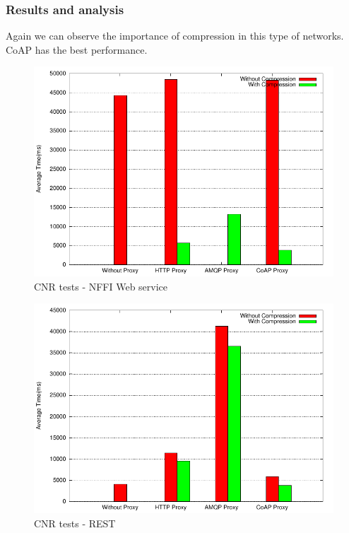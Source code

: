 \subsubsection{Results and analysis}

Again we can observe the importance of compression in this type of networks.
CoAP has the best performance.

\begin{figure}[H]
\center
\includegraphics[scale=0.75]{../results/cnr/nffi/result.pdf}
\caption{CNR tests - NFFI Web service}
\end{figure}

\begin{figure}[H]
\center
\includegraphics[scale=0.75]{../results/cnr/rest/result.pdf}
\caption{CNR tests - REST}
\end{figure}

